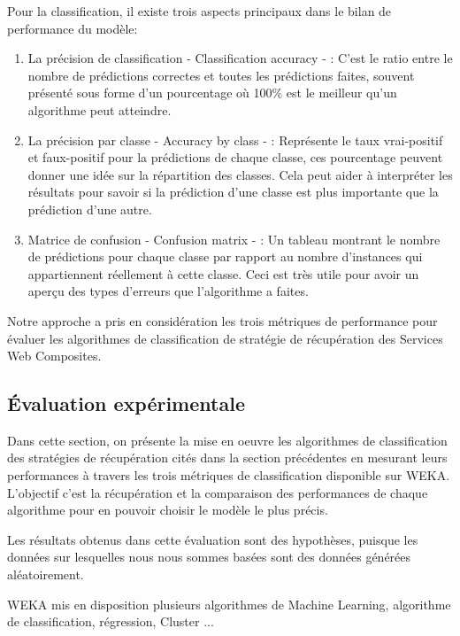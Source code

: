 Pour la classification, il existe trois aspects principaux dans le bilan de performance du modèle:

\begin{enumerate}
\item La précision de classification - Classification accuracy - : C'est le ratio entre le nombre de prédictions correctes et toutes les prédictions faites, souvent présenté sous forme d'un pourcentage où 100\% est le meilleur qu'un algorithme peut atteindre.

\item La précision par classe - Accuracy by class - : Représente le taux vrai-positif et faux-positif pour la prédictions de chaque classe, ces pourcentage peuvent donner une idée sur la répartition des classes. Cela peut aider à interpréter les résultats pour savoir si la prédiction d'une classe est plus importante que la prédiction d'une autre.

\item Matrice de confusion - Confusion matrix - : Un tableau montrant le nombre de prédictions pour chaque classe par rapport au nombre d'instances qui appartiennent réellement à cette classe. Ceci est très utile pour avoir un aperçu des types d'erreurs que l'algorithme a faites.

\end{enumerate}

Notre approche a pris en considération les trois métriques de performance pour évaluer les algorithmes de classification de stratégie de récupération des Services Web Composites. 

\subsection{Évaluation expérimentale}

Dans cette section, on présente la mise en oeuvre les algorithmes de classification des stratégies de récupération cités dans la section précédentes en mesurant leurs performances à travers les trois métriques de classification disponible sur WEKA.
L'objectif c'est la récupération et la comparaison des performances de chaque algorithme pour en pouvoir choisir le modèle le plus précis.

Les résultats obtenus dans cette évaluation sont des hypothèses, puisque les données sur lesquelles nous nous sommes basées sont des données générées aléatoirement.

WEKA mis en disposition plusieurs algorithmes de Machine Learning, algorithme de classification, régression, Cluster ...

